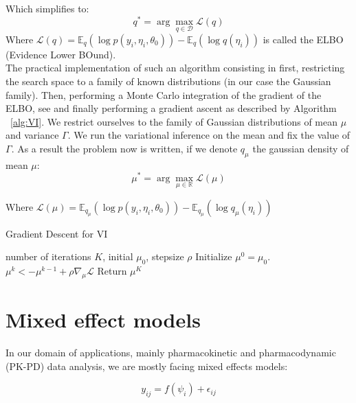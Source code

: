 \documentclass{article}
\begin{document}
Which simplifies to:
\begin{equation}
q^* = \arg \max \limits_{q \in \mathcal{D}} \mathcal{L}(q)
\end{equation}
Where $\mathcal{L}(q) = \mathbb{E}_q(\log p(y_i,\eta_i,\theta_0)) - \mathbb{E}_q(\log q(\eta_i))$ is called the ELBO (Evidence Lower BOund).\\

The practical implementation of such an algorithm consisting in first, restricting the search space to a family of known distributions (in our case the Gaussian family). Then, performing a Monte Carlo integration of the gradient of the ELBO, see \citep{ranganath} and finally performing a gradient ascent  as described by Algorithm ~\ref{alg:VI}. We restrict ourselves to the family of Gaussian distributions of mean $\mu$ and variance $\Gamma$. We run the variational inference on the mean and fix the value of $\Gamma$. As a result the problem now is written, if we denote $q_{\mu}$ the gaussian density of mean $\mu$:
\begin{equation}
\mu^* = \arg \max \limits_{\mu \in \mathbb{R}} \mathcal{L}(\mu)
\end{equation}

Where $\mathcal{L}(\mu) = \mathbb{E}_{q_{\mu}}(\log p(y_i,\eta_i,\theta_0)) - \mathbb{E}_{q_{\mu}}(\log q_{\mu}(\eta_i))$

\begin{algorithm}[h]
   \caption{Gradient Descent for VI}
   \label{alg:VI}
\begin{algorithmic}
    number of iterations $K$, initial $\mu_0$, stepsize $\rho$
  \STATE Initialize $\mu^0 = \mu_0$.
   \STATE $\mu^k <- \mu^{k-1} + \rho \nabla_{\mu} \mathcal{L}$
   \ENDFOR
  \STATE Return $\mu^K$
\end{algorithmic}
\end{algorithm}


\section{Mixed effect models} 

In our domain of applications, mainly pharmacokinetic and pharmacodynamic (PK-PD) data analysis, we are mostly facing mixed effects models:

\begin{equation}
y_{ij} = f(\psi_i) + \epsilon_{ij}
\end{equation}
\end{document}
